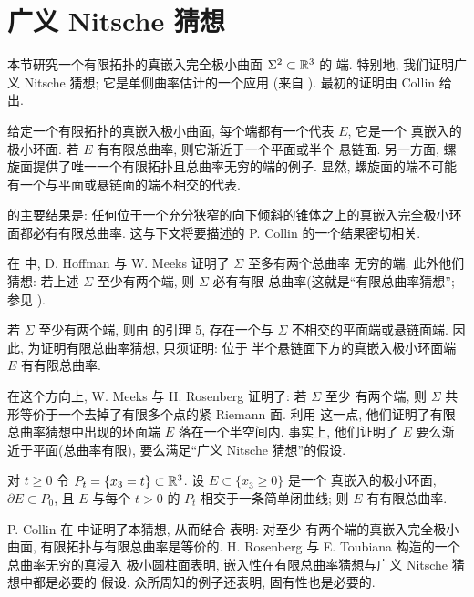 

\section{广义 Nitsche 猜想}
\label{sec:8.3}

本节研究一个有限拓扑的真嵌入完全极小曲面 $\Sigma^2\subset\mathbb{R}^3$ 的
端. 特别地, 我们证明广义 Nitsche 猜想; 它是单侧曲率估计的一个应用
(来自 \cite{CM10}). 最初的证明由 Collin \cite{Co} 给出.

给定一个有限拓扑的真嵌入极小曲面, 每个端都有一个代表 $E$, 它是一个
真嵌入的极小环面. 若 $E$ 有有限总曲率, 则它渐近于一个平面或半个
悬链面. 另一方面, 螺旋面提供了唯一一个有限拓扑且总曲率无穷的端的例子.
显然, 螺旋面的端不可能有一个与平面或悬链面的端不相交的代表.

\cite{CM10} 的主要结果是: 任何位于一个充分狭窄的向下倾斜的锥体之上的真嵌入完全极小环面都必有有限总曲率. 这与下文将要描述的 P. Collin
\cite{Co} 的一个结果密切相关.

在 \cite{HoMe2} 中, D. Hoffman 与 W. Meeks 证明了 $\Sigma$ 至多有两个总曲率
无穷的端. 此外他们猜想: 若上述 $\Sigma$ 至少有两个端, 则 $\Sigma$ 必有有限
总曲率(这就是``有限总曲率猜想''; 参见 \cite{Me1}).

若 $\Sigma$ 至少有两个端, 则由 \cite{HoMe2} 的引理 5, 存在一个与 $\Sigma$
不相交的平面端或悬链面端. 因此, 为证明有限总曲率猜想, 只须证明: 位于
半个悬链面下方的真嵌入极小环面端 $E$ 有有限总曲率.

在这个方向上, W. Meeks 与 H. Rosenberg \cite{MeR1} 证明了: 若 $\Sigma$ 至少
有两个端, 则 $\Sigma$ 共形等价于一个去掉了有限多个点的紧 Riemann 面. 利用
这一点, 他们证明了有限总曲率猜想中出现的环面端 $E$ 落在一个半空间内.
事实上, 他们证明了 $E$ 要么渐近于平面(总曲率有限), 要么满足``广义 Nitsche
猜想''的假设.

\begin{conjecture}
\label{conj:8.10}
对 $t\geq0$ 令 $P_t=\{x_3=t\}\subset\mathbb{R}^3$. 设 $E\subset\{x_3\geq0\}$ 是一个
真嵌入的极小环面, $\partial E\subset P_0$, 且 $E$ 与每个 $t>0$ 的
$P_t$ 相交于一条简单闭曲线; 则 $E$ 有有限总曲率.
\end{conjecture}

P. Collin 在 \cite{Co} 中证明了本猜想, 从而结合 \cite{MeR1} 表明: 对至少
有两个端的真嵌入完全极小曲面, 有限拓扑与有限总曲率是等价的. H.
Rosenberg 与 E. Toubiana \cite{RoTo} 构造的一个总曲率无穷的真浸入
极小圆柱面表明, 嵌入性在有限总曲率猜想与广义 Nitsche 猜想中都是必要的
假设. 众所周知的例子还表明, 固有性也是必要的.

